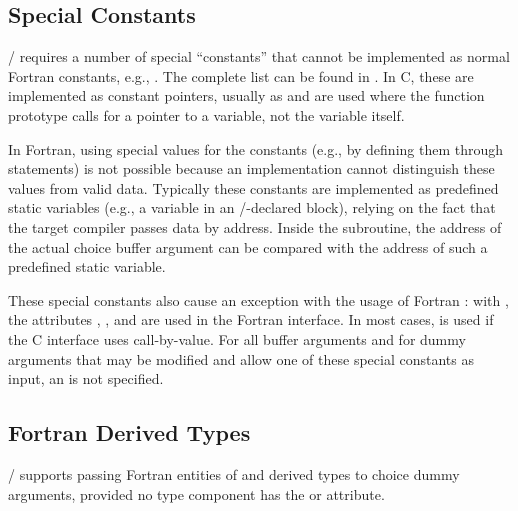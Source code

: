 \subsection{Special Constants}
\label{sec:f90-problems:special-constants}

\MPI/ requires a number of special ``constants'' that cannot be
implemented as normal Fortran constants, e.g.,
. The complete list can be found in
.
In C, these are implemented as constant pointers, usually as
 and are used where the function prototype calls for a pointer to
a variable, not the variable itself.

In Fortran,
using
special values for the constants (e.g., by defining
them through  statements) is not possible because an
implementation cannot distinguish these values from valid
data. Typically these constants are implemented as predefined
static variables (e.g., a variable in an \MPI/-declared 
block), relying on the fact that the target compiler passes data by
address.  Inside the subroutine, the address of the
actual choice buffer argument can be compared with the address
of such a predefined static variable.

These special constants also cause an exception with the
usage of Fortran :
with  , the attributes ,
, and  are used in the Fortran
interface. In most cases,  is used if the C interface
uses call-by-value. For all buffer arguments and
for dummy arguments that may be modified and allow one of
these special constants as input, an 
is not specified.

\subsection{Fortran Derived Types}
\label{sec:f90-problems:derived-types}

\MPI/ supports passing Fortran
entities of  and  derived
types to choice dummy arguments, provided no type component
has the  or  attribute.

